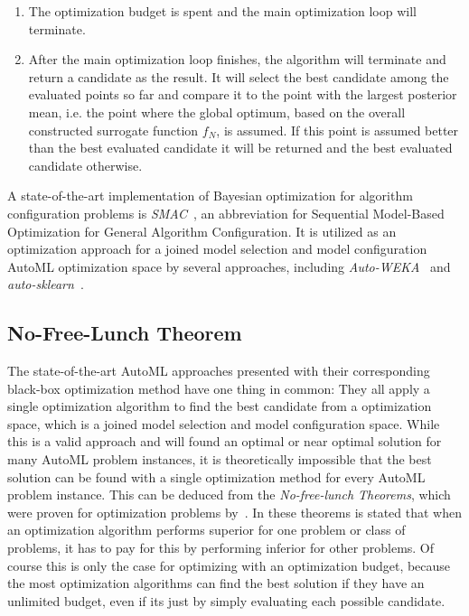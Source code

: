 \begin{enumerate}
    \item The optimization budget is spent and the main optimization loop will terminate.
    \item After the main optimization loop finishes, the algorithm will terminate and return a candidate as the result.
    It will select the best candidate among the evaluated points so far and compare it to the point with the largest posterior mean, i.e. the point where the global optimum, based on the overall constructed surrogate function $f_N$, is assumed.
    If this point is assumed better than the best evaluated candidate it will be returned and the best evaluated candidate otherwise.
\end{enumerate}
A state-of-the-art implementation of Bayesian optimization for algorithm configuration problems is \textit{SMAC}~\cite{Hutter-SMAC}, an abbreviation for Sequential Model-Based Optimization for General Algorithm Configuration.
It is utilized as an optimization approach for a joined model selection and model configuration AutoML optimization space by several approaches, including \textit{Auto-WEKA}~\cite{Thornton-AutoWeka} and \textit{auto-sklearn}~\cite{Feurer-AutoSklearn}.

\subsection{No-Free-Lunch Theorem}
\label{sec:theory:optimization:lunch}
The state-of-the-art AutoML approaches presented with their corresponding black-box optimization method have one thing in common: They all apply a single optimization algorithm to find the best candidate from a optimization space, which is a joined model selection and model configuration space.
While this is a valid approach and will found an optimal or near optimal solution for many AutoML problem instances, it is theoretically impossible that the best solution can be found with a single optimization method for every AutoML problem instance.
This can be deduced from the \textit{No-free-lunch Theorems}, which were proven for optimization problems by~\textcite{Wolpert-No-Free-Lunch-Theorems}.
In these theorems is stated that when an optimization algorithm performs superior for one problem or class of problems, it has to pay for this by performing inferior for other problems.
Of course this is only the case for optimizing with an optimization budget, because the most optimization algorithms can find the best solution if they have an unlimited budget, even if its just by simply evaluating each possible candidate.

